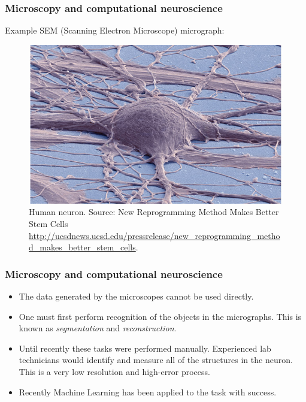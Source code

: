 \documentclass{beamer}
\begin{document}
\begin{frame}
\frametitle{Microscopy and computational neuroscience}

Example SEM (Scanning Electron Microscope) micrograph:

\begin{figure}[H]
    \centering
    \includegraphics[scale=1.5]{../blog/images/2014_06_26_human_ipsc_derived_neuron_deerinck}
    \caption{Human neuron. Source: New Reprogramming Method Makes Better Stem Cells
      \url{http://ucsdnews.ucsd.edu/pressrelease/new_reprogramming_method_makes_better_stem_cells}.}
    \label{fig:3d_neuron}
\end{figure}

\end{frame}

\begin{frame}
\frametitle{Microscopy and computational neuroscience}

\begin{itemize}
\item The data generated by the microscopes cannot be used
  directly.
\pause
\item One must first perform recognition of the objects in the
  micrographs. This is known as \emph{segmentation} and
  \emph{reconstruction}.
\pause
\item Until recently these tasks were performed manually. Experienced
  lab technicians would identify and measure all of the structures in
  the neuron. This is a very low resolution and high-error process.
\pause
\item Recently Machine Learning has been applied to the task with
  success.
\end{itemize}

\end{frame}
\end{document}
